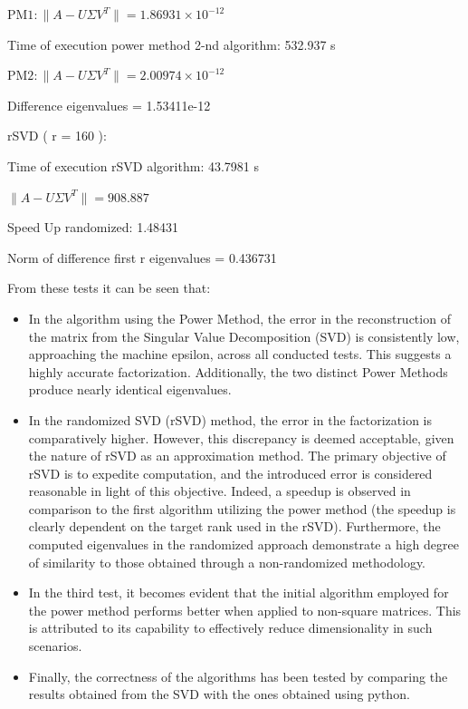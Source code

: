 \documentclass{article}
\begin{document}
\begin{enumerate}
\( \text{PM1} : \| A - U \Sigma V^T \| = 1.86931 \times 10^{-12} \)

Time of execution power method 2-nd algorithm: 532.937 s

\( \text{PM2} : \| A - U \Sigma V^T \| = 2.00974 \times 10^{-12} \)

Difference eigenvalues = 1.53411e-12

\vspace{\baselineskip}
rSVD ( r = 160 ):

Time of execution rSVD algorithm: 43.7981 s

\(\| A - U \Sigma V^T \| = 908.887 \)

Speed Up randomized: 1.48431

Norm of difference first r eigenvalues = 0.436731
\end{enumerate}
\vspace{\baselineskip}

From these tests it can be seen that:
\begin{itemize}
\item In the algorithm using the Power Method, the error in the reconstruction of the matrix from the Singular Value Decomposition (SVD) is consistently low, approaching the machine epsilon, across all conducted tests. This suggests a highly accurate factorization. Additionally, the two distinct Power Methods produce nearly identical eigenvalues.

\item In the randomized SVD (rSVD) method, the error in the factorization is comparatively higher. However, this discrepancy is deemed acceptable, given the nature of rSVD as an approximation method. The primary objective of rSVD is to expedite computation, and the introduced error is considered reasonable in light of this objective. Indeed, a speedup is observed in comparison to the first algorithm utilizing the power method (the speedup is clearly dependent on the target rank used in the rSVD). Furthermore, the computed eigenvalues in the randomized approach demonstrate a high degree of similarity to those obtained through a non-randomized methodology.

\item In the third test, it becomes evident that the initial algorithm employed for the power method performs better when applied to non-square matrices. This is attributed to its capability to effectively reduce dimensionality in such scenarios.

\item Finally, the correctness of the algorithms has been tested by comparing the results obtained from the SVD with the ones obtained using python.

\end{itemize}
\end{document}
